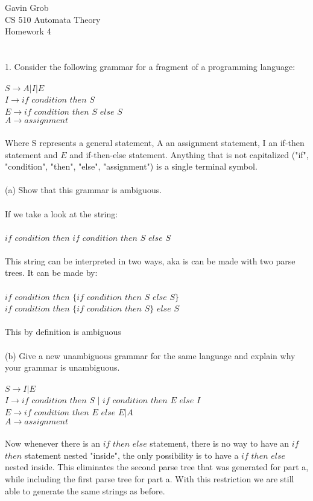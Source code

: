 \documentclass[11pt, oneside]{article}   	%
\begin{document}
Gavin Grob
\\CS 510 Automata Theory
\\Homework 4
\\
\\
\\1. Consider the following grammar for a fragment of a programming language:
\\
\\$S \rightarrow A|I|E$
\\$I \rightarrow if$ $condition$ $then$ $S$
\\$E \rightarrow if$ $condition$ $then$ $S$ $else$ $S$
\\$A \rightarrow assignment$
\\
\\Where S represents a general statement, A an assignment statement, I an if-then statement and $E$ and if-then-else statement. Anything that is not capitalized ("if", "condition", "then", "else", "assignment") is a single terminal symbol.
\\
\\(a) Show that this grammar is ambiguous.
\\
\\If we take a look at the string:
\\
\\$if$ $condition$ $then$ $if$ $condition$ $then$ $S$ $else$ $S$
\\
\\This string can be interpreted in two ways, aka is can be made with two parse trees. It can be made by:
\\
\\$if$ $condition$ $then$ $\{if$ $condition$ $then$ $S$ $else$ $S\}$
\\$if$ $condition$ $then$ $\{if$ $condition$ $then$ $S\}$ $else$ $S$
\\
\\This by definition is ambiguous
\\
\\(b) Give a new unambiguous grammar for the same language and explain why your grammar is unambiguous.
\\
\\$S \rightarrow I|E$
\\$I \rightarrow if$ $condition$ $then$ $S$ $|$ $if$ $condition$ $then$ $E$ $else$ $I$
\\$E \rightarrow if$ $condition$ $then$ $E$ $else$ $E|A$
\\$A \rightarrow assignment$
\\
\\Now whenever there is an $if$ $then$ $else$ statement, there is no way to have an $if$ $then$ statement nested "inside", the only possibility is to have a $if$ $then$ $else$ nested inside. This eliminates the second parse tree that was generated for part a, while including the first parse tree for part a. With this restriction we are still able to generate the same strings as before.
\end{document}

